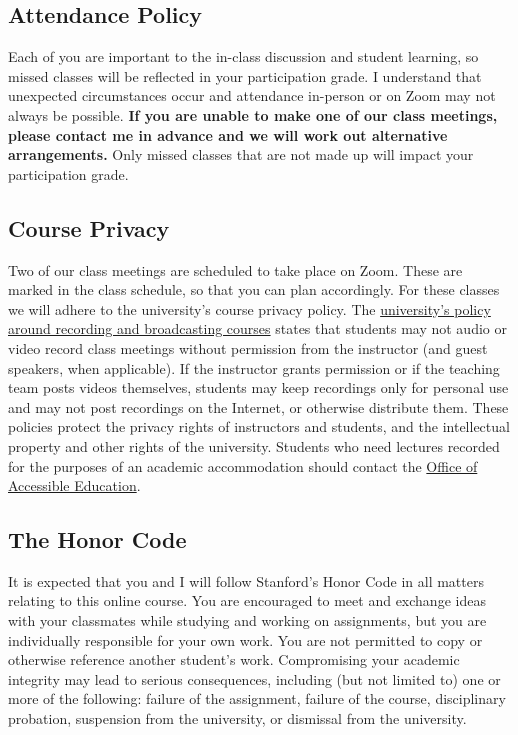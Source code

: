 \documentclass[11pt,]{article}
\begin{document}
\hypertarget{attendance-policy}{%
\subsection{Attendance Policy}\label{attendance-policy}}

Each of you are important to the in-class discussion and student
learning, so missed classes will be reflected in your participation
grade. I understand that unexpected circumstances occur and attendance
in-person or on Zoom may not always be possible. \textbf{If you are
unable to make one of our class meetings, please contact me in advance
and we will work out alternative arrangements.} Only missed classes that
are not made up will impact your participation grade.

\hypertarget{course-privacy}{%
\subsection{Course Privacy}\label{course-privacy}}

Two of our class meetings are scheduled to take place on Zoom. These are
marked in the class schedule, so that you can plan accordingly. For
these classes we will adhere to the university's course privacy policy.
The
\href{https://library.stanford.edu/using/copyright-reminder/common-situations/recording-broadcasting-courses}{university's
policy around recording and broadcasting courses} states that students
may not audio or video record class meetings without permission from the
instructor (and guest speakers, when applicable). If the instructor
grants permission or if the teaching team posts videos themselves,
students may keep recordings only for personal use and may not post
recordings on the Internet, or otherwise distribute them. These policies
protect the privacy rights of instructors and students, and the
intellectual property and other rights of the university. Students who
need lectures recorded for the purposes of an academic accommodation
should contact the \href{https://oae.stanford.edu/}{Office of Accessible
Education}.

\hypertarget{the-honor-code}{%
\subsection{The Honor Code}\label{the-honor-code}}

It is expected that you and I will follow Stanford's Honor Code in all
matters relating to this online course. You are encouraged to meet and
exchange ideas with your classmates while studying and working on
assignments, but you are individually responsible for your own work. You
are not permitted to copy or otherwise reference another student's work.
Compromising your academic integrity may lead to serious consequences,
including (but not limited to) one or more of the following: failure of
the assignment, failure of the course, disciplinary probation,
suspension from the university, or dismissal from the university.
\end{document}
